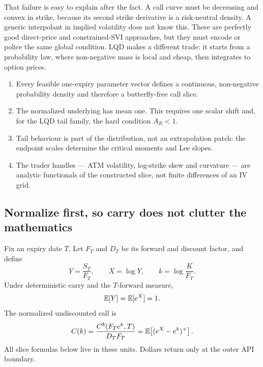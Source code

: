\documentclass[11pt]{article}
\begin{document}
That failure is easy to explain after the fact.  A call curve must be decreasing
and convex in strike, because its second strike derivative is a risk-neutral
density.  A generic interpolant in implied volatility does not know this.
There are perfectly good direct-price and constrained-SVI approaches, but they
must encode or police the same global condition.  LQD makes a different trade:
it starts from a probability law, where non-negative mass is local and cheap,
then integrates to option prices.

\begin{invariant}
\begin{enumerate}[leftmargin=1.6em]
\item Every feasible one-expiry parameter vector defines a continuous,
non-negative probability density and therefore a butterfly-free call slice.
\item The normalized underlying has mean one.  This requires one scalar shift
and, for the LQD tail family, the hard condition $A_R<1$.
\item Tail behaviour is part of the distribution, not an extrapolation patch:
the endpoint scales determine the critical moments and Lee slopes.
\item The trader handles --- ATM volatility, log-strike skew and curvature ---
are analytic functionals of the constructed slice, not finite differences of
an IV grid.
\end{enumerate}
\end{invariant}

\subsection{Normalize first, so carry does not clutter the mathematics}

Fix an expiry date $T$.  Let $F_T$ and $D_T$ be its forward and discount factor,
and define
\begin{equation}
Y=\frac{S_T}{F_T},\qquad X=\log Y,\qquad
k=\log\frac{K}{F_T}.
\label{eq:variables}
\end{equation}
Under deterministic carry and the $T$-forward measure,
\begin{equation}
\mathbb{E}[Y]=\mathbb{E}[e^X]=1.
\label{eq:martingale}
\end{equation}
The normalized undiscounted call is
\begin{equation}
C(k)=\frac{C^\$(F_Te^k,T)}{D_TF_T}
     =\mathbb{E}\!\left[(e^X-e^k)^+\right].
\label{eq:call_expectation}
\end{equation}
All slice formulas below live in these units.  Dollars return only at the outer
API boundary.
\end{document}
